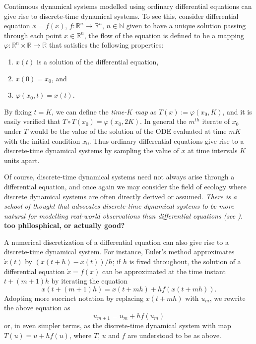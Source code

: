 \documentclass[12 pt]{article}
\begin{document}
Continuous dynamical systems modelled using ordinary differential equations can give rise to discrete-time dynamical systems. To see this, consider differential equation $\dot{x} = f(x)$, $f: \mathbb{R}^n \to \mathbb{R}^n$, $n\in\mathbb{N}$ given to have a unique solution passing through 
each point $x\in\mathbb{R}^{n}$, the flow of the equation \label{defn_flow} is defined to be a mapping $\varphi: \mathbb{R}^n \times \mathbb{R} \to \mathbb{R}$ that satisfies the following properties:
\vspace{-8mm}
\begin{enumerate}[noitemsep, label=\roman*.]
  \item $x(t)$ is a solution of the differential equation,
  \item $x(0)=x_0$, and
  \item $\varphi(x_0,t) = x(t)$.
\end{enumerate}
By fixing $t=K$, we can define the \emph{time-$K$ map} as  $T(x):= \varphi(x_0,K)$, and it is easily verified that $T\circ T(x_0) = \varphi(x_0,2K)$. In general the $m^{th}$ iterate of $x_0$ under $T$ would be the value of the solution of the ODE evaluated at time $mK$ with the initial condition $x_0$. 
Thus ordinary differential equations give rise to a discrete-time dynamical systems by sampling the value of $x$ at time intervals $K$ units apart. 

Of course, discrete-time dynamical systems need not always arise through a differential equation, and once again we may consider the field of ecology where discrete dynamical systems are often directly derived or assumed. 
\emph{There is a school of thought that advocates discrete-time dynamical systems to be more natural for modelling real-world observations than differential equations (see \cite{saber2010introduction})}. \textbf{too philosphical, or actually good?}

A numerical discretization of a differential equation can also give rise to a discrete-time dynamical system. For instance, Euler's method approximates $\dot{x}(t)$ by $(x(t+h)-x(t))/h$; if $h$ is fixed throughout, the solution of a differential equation $\dot{x}=f(x)$ 
can be approximated at the time instant $t+(m+1)h$ by iterating the equation 
$$x(t+(m+1)h) = x(t+mh) + h f(x(t+mh)).$$ 
Adopting more succinct notation by replacing $x(t+mh)$ with $u_m$, we rewrite the above equation as
$$u_{m+1} = u_m + hf(u_m)$$
or, in even simpler terms, as the discrete-time dynamical system with map $T(u) = u + hf(u)$, where $T$, $u$ and $f$ are understood to be as above.
\end{document}
